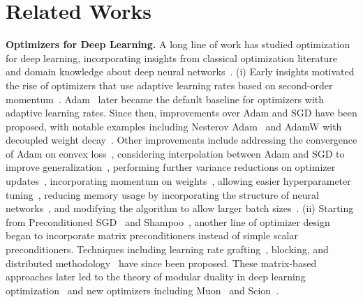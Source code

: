\section{Related Works}

\textbf{Optimizers for Deep Learning.} A long line of work has studied optimization
for deep learning, incorporating insights from classical optimization literature~\cite{robbins1951stochastic,nesterov1983method,duchi2011adaptive} and domain knowledge about deep neural networks~\cite{pmlr-v28-sutskever13}. (i) Early insights motivated the rise of optimizers that use adaptive learning rates based on second-order momentum~\cite{tieleman2012lecture,zeiler2012adadeltaadaptivelearningrate,kingma2017adammethodstochasticoptimization}. Adam~\cite{kingma2017adammethodstochasticoptimization} later became the default baseline for optimizers with adaptive learning rates. Since then, improvements over Adam and SGD have been proposed, with notable examples including Nesterov Adam~\cite{dozat2016incorporating} and AdamW with decoupled weight decay~\cite{loshchilov2019decoupled}. Other improvements include addressing the convergence of Adam on convex loss~\cite{j.2018on,zaheer2018adaptive,taniguchi2024adoptmodifiedadamconverge}, considering interpolation between Adam and SGD to improve generalization~\cite{luo2019adaptivegradientmethodsdynamic,xie2022adaptiveinertiadisentanglingeffects}, performing further variance reductions on optimizer updates~\cite{liu2021varianceadaptivelearningrate,zhang2019lookaheadoptimizerksteps,yuan2025mars,xie2024adanadaptivenesterovmomentum,pagliardini2024ademamixoptimizerbetterfaster,zhuang2020adabeliefoptimizeradaptingstepsizes}, incorporating momentum on weights~\cite{ivgi2023dogsgdsbestfriend,defazio2024roadscheduled}, allowing easier hyperparameter tuning~\cite{pmlr-v202-defazio23a,mishchenko2024prodigyexpeditiouslyadaptiveparameterfree,defazio2024optimallineardecaylearning}, reducing memory usage by incorporating the structure of 
neural networks~\cite{shazeer2018adafactoradaptivelearningrates,zhang2025adamminiusefewerlearning,zhu2025apollosgdlikememoryadamwlevel,luo2023cameconfidenceguidedadaptivememory,modoranu2024microadam,zhao2024galorememoryefficientllmtraining}, and modifying the algorithm to allow larger batch sizes~\cite{you2017largebatchtrainingconvolutional,you2020largebatchoptimizationdeep}.
(ii) Starting from Preconditioned SGD~\cite{Li_2018} and Shampoo~\cite{gupta2018shampoopreconditionedstochastictensor}, another line of optimizer design~\cite{morwani2024newperspectiveshampoospreconditioner,eschenhagen2023kronecker,martens2020optimizingneuralnetworkskroneckerfactored,li2018preconditionermatrixliegroup,eschenhagen2025purifyingshampooinvestigatingshampoos} began to incorporate matrix preconditioners instead of simple scalar preconditioners. Techniques including learning rate grafting~\cite{agarwal2020disentanglingadaptivegradientmethods}, blocking, and distributed methodology~\cite{anil2021scalablesecondorderoptimization} have since been proposed. These matrix-based approaches later led to the theory of modular duality in deep learning optimization~\cite{bernstein2024modulardualitydeeplearning,bernstein2024oldoptimizernewnorm,large2024scalableoptimizationmodularnorm} and new optimizers including Muon~\cite{jordan2024muon} and Scion~\cite{pethick2025trainingdeeplearningmodels}.
